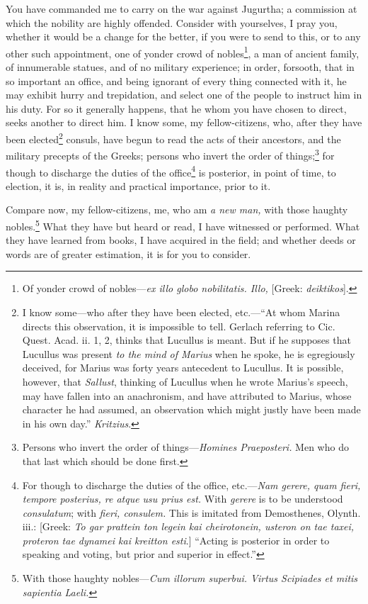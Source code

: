 You have commanded me to carry on the war against Jugurtha; a
commission at which the nobility are highly offended. Consider with
yourselves, I pray you, whether it would be a change for the better,
if you were to send to this, or to any other such appointment, one of
yonder crowd of nobles\footnote{Of yonder crowd of nobles—\emph{ex illo globo nobilitatis. Illo,}
[Greek: \emph{deiktikos}].}, a man of ancient family, of innumerable
statues, and of no military experience; in order, forsooth, that in so
important an office, and being ignorant of every thing connected with
it, he may exhibit hurry and trepidation, and select one of the people
to instruct him in his duty. For so it generally happens, that he whom
you have chosen to direct, seeks another to direct him. I know some,
my fellow-citizens, who, after they have been elected\footnote{I know some—who after they have been elected, etc.—``At
whom Marina directs this observation, it is impossible to tell.
Gerlach referring to Cic. Quest. Acad. ii. 1, 2, thinks that Lucullus
is meant. But if he supposes that Lucullus was present \emph{to the mind of
Marius} when he spoke, he is egregiously deceived, for Marius was
forty years antecedent to Lucullus. It is possible, however, that
\emph{Sallust}, thinking of Lucullus when he wrote Marius's speech, may
have fallen into an anachronism, and have attributed to Marius, whose
character he had assumed, an observation which might justly have been
made in his own day.'' \emph{Kritzius}.} consuls,
have begun to read the acts of their ancestors, and the military
precepts of the Greeks; persons who invert the order of things;\footnote{Persons who invert the order of things—\emph{Homines Praeposteri.}
Men who do that last which should be done first.}
for though to discharge the duties of the office\footnote{For though to discharge the duties of the office, etc.—\emph{Nam
gerere, quam fieri, tempore posterius, re atque usu prius est.} With
\emph{gerere} is to be understood \emph{consulatum}; with \emph{fieri, consulem.}
This is imitated from Demosthenes, Olynth. iii.: [Greek: \emph{To gar
prattein ton legein kai cheirotonein, usteron on tae taxei, proteron
tae dynamei kai kreitton esti}.] ``Acting is posterior in order to
speaking and voting, but prior and superior in effect.''} is posterior, in
point of time, to election, it is, in reality and practical
importance, prior to it.

Compare now, my fellow-citizens, me, who am \emph{a new man,} with those
haughty nobles.\footnote{With those haughty nobles—\emph{Cum illorum superbui. Virtus
Scipiades et mitis sapientia Laeli.}} What they have but heard or read, I have
witnessed or performed. What they have learned from books, I have
acquired in the field; and whether deeds or words are of greater
estimation, it is for you to consider.

